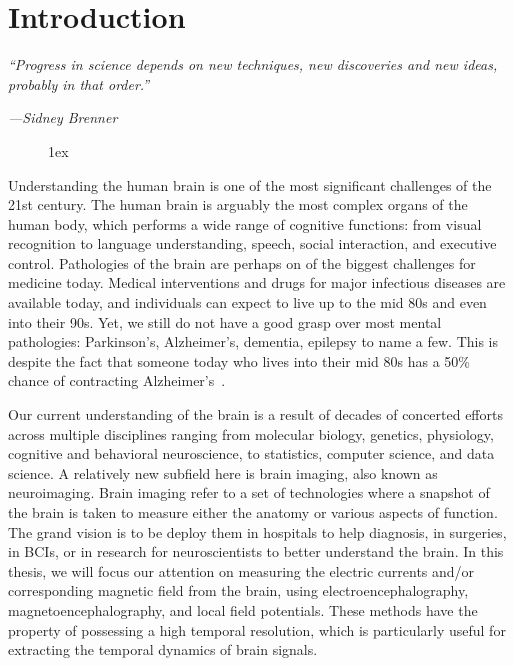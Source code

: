 \chapter{Introduction}
\label{chapter:intro}
\pagestyle{mainmatter}

\epigraph{\small\itshape ``Progress in science depends on new techniques, new discoveries and new ideas, probably in that order.''}{\small\textit{---Sidney Brenner}}

\begin{figure}[ht!]
\centering
\begingroup
\etocstandardlines
\renewcommand{\etocbelowtocskip}{0pt\relax}
\fboxsep1ex
\localtableofcontents
\endgroup
\end{figure}

\clearpage

Understanding the human brain is one of the most significant challenges of the 21st century. The human brain is arguably the most complex  organs of the human body, which performs a wide range of cognitive functions: from visual recognition to language understanding, speech, social interaction, and executive control. Pathologies of the brain are perhaps on of the biggest challenges for medicine today. Medical interventions and drugs for major infectious diseases are available today, and individuals can expect to live up to the mid 80s and even into their 90s. Yet, we still do not have a good grasp over most mental pathologies: Parkinson's, Alzheimer's, dementia, epilepsy to name a few. This is despite the fact that someone today who lives into their mid 80s has a 50\% chance of contracting Alzheimer's~\citep{alzheimer20162016}.

Our current understanding of the brain is a result of decades of concerted efforts across multiple disciplines ranging from molecular biology, genetics, physiology, cognitive and behavioral neuroscience, to statistics, computer science, and data science. A relatively new subfield here is brain imaging, also known as neuroimaging. Brain imaging refer to a set of technologies where a snapshot of the brain is taken to measure either the anatomy or various aspects of function. The grand vision is to be deploy them in hospitals to help diagnosis, in surgeries, in \acp{BCI}, or in research for neuroscientists to better understand the brain. 
In this thesis, we will focus our attention on measuring the electric currents and/or corresponding magnetic field from the brain, using electroencephalography, magnetoencephalography, and local field potentials. 
These methods have the property of possessing a high temporal resolution, which is particularly useful for extracting the temporal dynamics of brain signals.

